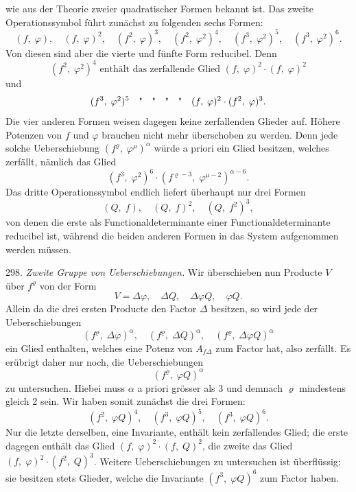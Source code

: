 wie aus der Theorie zweier quadratischer Formen bekannt ist. Das zweite Operationssymbol führt zunächst zu folgenden sechs Formen:
\[
(f, \; \varphi), \quad (f, \; \varphi)^2, \quad (f^2, \; \varphi)^3, \quad (f^2, \; \varphi^2)^4, \quad (f^3, \; \varphi^2)^5, \quad (f^3, \; \varphi^2)^6.
\]
Von diesen sind aber die vierte und fünfte Form reducibel. Denn
\[
(f^2, \; \varphi^2)^4 \text{ enthält das zerfallende Glied } (f, \; \varphi)^2 \cdot (f, \; \varphi)^2
\]
und
\[
(f^3, \; \varphi^2)^5 \quad \text{\textquotedbl} \quad \text{\textquotedbl} \quad \text{\textquotedbl} \quad \text{\textquotedbl} \quad (f, \; \varphi)^2 \cdot (f^2, \; \varphi)^3.
\]
Die vier anderen Formen weisen dagegen keine zerfallenden Glieder auf. Höhere Potenzen von $f$ und $\varphi$ brauchen nicht mehr überschoben zu werden. Denn jede solche Ueberschiebung $(f^\varrho, \; \varphi^\mu)^\alpha$ würde a priori ein Glied besitzen, welches zerfällt, nämlich das Glied
\[
(f^3, \; \varphi^2)^6 \cdot (f^{\varrho-3}, \; \varphi^{\mu-2})^{\alpha-6}.
\]
Das dritte Operationssymbol endlich liefert überhaupt nur drei Formen
\[
(Q, \; f), \quad (Q, \; f)^2, \quad (Q, \; f^2)^3,
\]
von denen die erste als Functionaldeterminante einer Functionaldeterminante reducibel ist, während die beiden anderen Formen in das System aufgenommen werden müssen.

298. \textit{Zweite Gruppe von Ueberschiebungen.} Wir überschieben nun Producte $V$ über $f^\varrho$ von der Form
\[
V = \Delta\varphi, \quad \Delta Q, \quad \Delta\varphi Q, \quad \varphi Q.
\]
Allein da die drei ersten Producte den Factor $\Delta$ besitzen, so wird jede der Ueberschiebungen
\[
(f^\varrho, \; \Delta\varphi)^\alpha, \quad (f^\varrho, \; \Delta Q)^\alpha, \quad (f^\varrho, \; \Delta\varphi Q)^\alpha
\]
ein Glied enthalten, welches eine Potenz von $A_{f\Delta}$ zum Factor hat, also zerfällt. Es erübrigt daher nur noch, die Ueberschiebungen
\[
(f^\varrho, \; \varphi Q)^\alpha
\]
zu untersuchen. Hiebei muss $\alpha$ a priori grösser als 3 und demnach $\varrho$ mindestens gleich 2 sein. Wir haben somit zunächst die drei Formen:
\[
(f^2, \; \varphi Q)^4, \quad (f^3, \; \varphi Q)^5, \quad (f^3, \; \varphi Q)^6.
\]
Nur die letzte derselben, eine Invariante, enthält kein zerfallendes Glied; die erste dagegen enthält das Glied $(f, \; \varphi)^2 \cdot (f, \; Q)^2$, die zweite das Glied $(f, \; \varphi)^2 \cdot (f^2, \; Q)^3$. Weitere Ueberschiebungen zu untersuchen ist überflüssig; sie besitzen stets Glieder, welche die Invariante $(f^3, \; \varphi Q)^6$ zum Factor haben.

